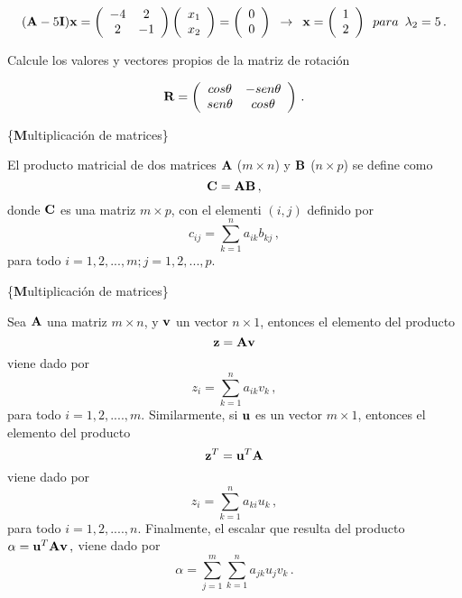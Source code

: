 \documentclass[
]{agujournal2019}
\begin{document}
\[({\textbf A}-5{\textbf I}){\textbf x}=
\left(\begin{array}{ccccc}
  -4 & 2\\
  2 & -1\\
      \end{array}\right)
      \left(\begin{array}{c}
  x_1 \\
  x_2 \\
      \end{array}\right)=
      \left(\begin{array}{c}
  0 \\
  0 \\
      \end{array}\right)\,\,\,\rightarrow\,\,\,{\textbf x}=\left(\begin{array}{c}
  1 \\
  2 \\
      \end{array}\right)\,\,\,{ para}\,\,\,\lambda_2=5\,.\]

\vspace{0.25cm}

 Calcule los valores y vectores propios de
la matriz de rotación

\[{\textbf R}=
\left(\begin{array}{ccccc}
  cos\theta & -sen\theta\\
  sen\theta & cos\theta\\
      \end{array}\right)\,.\]

\vspace{0.5cm}

\{\noindent \textbf Multiplicación de matrices\}

\noindent El producto matricial de dos matrices \({\textbf A}\)
(\(m\times n\)) y \({\textbf B}\) (\(n\times p\)) se define como
\[{\textbf C}={\textbf A}{\textbf B}\,,\] donde \({\textbf C}\) es una
matriz \(m\times p\), con el elementi \((i,j)\) definido por
\[c_{ij}=\sum^n_{k=1} a_{ik} b_{kj}\,,\] para todo
\(i=1,2,...,m; j=1,2,...,p\).

\vspace{0.5cm}

\{\noindent \textbf Multiplicación de matrices\}

\noindent Sea \({\textbf A}\) una matriz \(m\times n\), y
\({\textbf v}\) un vector \(n\times 1\), entonces el elemento del
producto \[{\textbf z}={\textbf A}{\textbf v}\] viene dado por
\[z_{i}=\sum^n_{k=1} a_{ik} v_{k}\,,\] para todo \(i=1,2,....,m\).
Similarmente, si \({\textbf u}\) es un vector \(m\times 1\), entonces el
elemento del producto \[{\textbf z}^T={\textbf u}^T{\textbf A}\] viene
dado por \[z_{i}=\sum^n_{k=1} a_{ki} u_{k}\,,\] para todo
\(i=1,2,....,n\). Finalmente, el escalar que resulta del producto
\(\alpha={\textbf u}^T{\textbf A}{\textbf v}\,,\) viene dado por
\[\alpha=\sum^m_{j=1}\sum^n_{k=1}a_{jk} u_j v_k\,.\]
\end{document}
